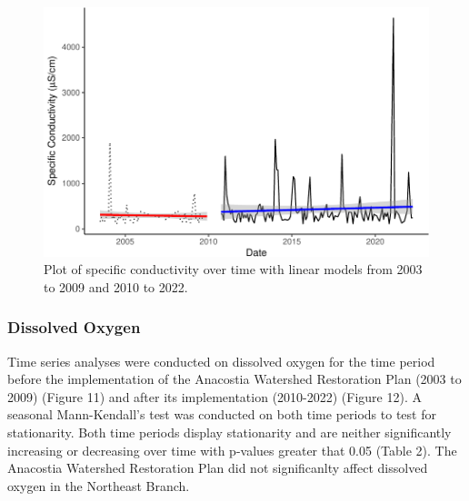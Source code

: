 \documentclass[
  12pt,
]{article}
\begin{document}
\newpage

\begin{figure}

{\centering \includegraphics{Fischer_WDA_FinalProject_files/figure-latex/Plot of Specific Conductance over time with LMs-1} 

}

\caption{Plot of specific conductivity over time with linear models from 2003 to 2009 and 2010 to 2022.}\label{fig:Plot of Specific Conductance over time with LMs}
\end{figure}

\newpage

\hypertarget{dissolved-oxygen}{%
\subsubsection{Dissolved Oxygen}\label{dissolved-oxygen}}

Time series analyses were conducted on dissolved oxygen for the time
period before the implementation of the Anacostia Watershed Restoration
Plan (2003 to 2009) (Figure 11) and after its implementation (2010-2022)
(Figure 12). A seasonal Mann-Kendall's test was conducted on both time
periods to test for stationarity. Both time periods display stationarity
and are neither significantly increasing or decreasing over time with
p-values greater that 0.05 (Table 2). The Anacostia Watershed
Restoration Plan did not significanlty affect dissolved oxygen in the
Northeast Branch.
\end{document}

